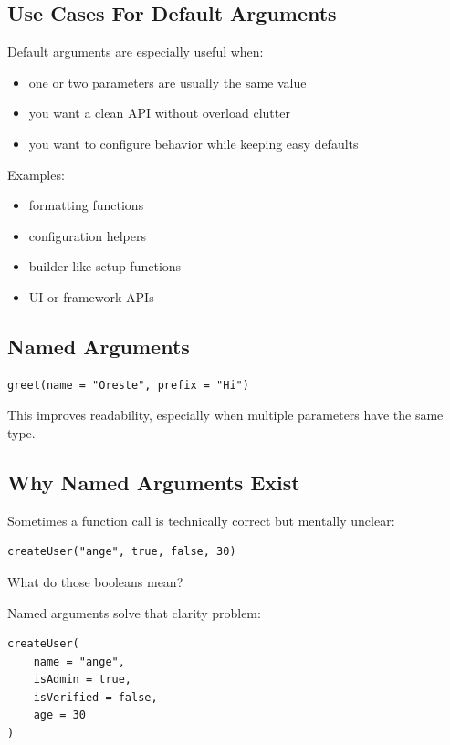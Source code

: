 \documentclass[11pt,a4paper]{article}
\begin{document}
\subsection{Use Cases For Default Arguments}

Default arguments are especially useful when:
\begin{itemize}
    \item one or two parameters are usually the same value
    \item you want a clean API without overload clutter
    \item you want to configure behavior while keeping easy defaults
\end{itemize}

Examples:
\begin{itemize}
    \item formatting functions
    \item configuration helpers
    \item builder-like setup functions
    \item UI or framework APIs
\end{itemize}

\subsection{Named Arguments}

\begin{lstlisting}[style=kazekotlin]
greet(name = "Oreste", prefix = "Hi")
\end{lstlisting}

This improves readability, especially when multiple parameters have the same type.

\subsection{Why Named Arguments Exist}

Sometimes a function call is technically correct but mentally unclear:

\begin{lstlisting}[style=kazekotlin]
createUser("ange", true, false, 30)
\end{lstlisting}

What do those booleans mean?

Named arguments solve that clarity problem:

\begin{lstlisting}[style=kazekotlin]
createUser(
    name = "ange",
    isAdmin = true,
    isVerified = false,
    age = 30
)
\end{lstlisting}
\end{document}
